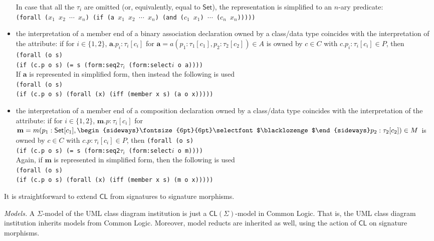 \documentclass[10pt,fleqn,final]{scrreprt}
\newcommand{\cbs}[0]{\color{red}\xspace} %
\newcommand{\cbe}[0]{\color{black}\xspace} %
\newcommand*{\CL}{\ensuremath{\mathsf{CL}}\xspace}
\newenvironment{definitions}[0]{\medskip }{}
\newcommand{\composition}{\raisebox{0.2pt}{\begin{sideways}\fontsize{6pt}{6pt}\selectfont$\blacklozenge$\end{sideways}}}
\newcommand{\white}[1]{{\color{white}{#1}}}
\newcommand{\qqquad}{\white{x}\qquad}
\begin{document}
\begin{definitions}
\begin{itemize}
In case that all the $\tau_i$ are omitted (or, equivalently, equal to 
$\mathsf{Set}$), the representation is simplified to an $n$-ary predicate:\\
\texttt{(forall ($x_1$ $x_2$ $\cdots$  $x_n$) (if (a $x_1$ $x_2$ $\cdots$  $x_n$) (and ($c_1$ $x_1$) $\cdots$ ($c_n$ $x_n$)))))}
\item the interpretation of a member end of a binary association
declaration owned by a class/data type coincides with the interpretation
of the attribute: if for $i\in\{1,2\}$, $\mathbf{a}.p_i : \tau_i[c_i]$ for
$\mathbf{a} = a(p_1 : \tau_1[c_1], p_2 : \tau_2[c_2]) \in A$ is owned by
$c \in C$ with $c.p_i : \tau_i[c_i] \in P$, then\\
\texttt{(forall (o s)\\
\qqquad (if (c.p o s) (= s (form:seq2$\tau_i$ (form:select$i$ o a))))}\\
If $\mathbf{a}$ is represented in simplified form, then instead\cbs the following is used\cbe \\
\texttt{(forall (o s)\\
\qqquad (if (c.p o s) (forall (x) (iff (member x s) (a o x)))))}
\item the interpretation of a member end of a composition declaration
owned by a class/data type coincides with the interpretation of the
attribute: if for $i\in\{1,2\}$, $\mathbf{m}.p : \tau_i[c_i]$ for $\mathbf{m}=m(p_1 : \mathsf{Set}[c_1], \composition p_2 : \tau_2[c_2]) \in M$ is owned
by $c \in C$ with $c.p : \tau_i[c_i] \in P$, then
\texttt{(forall (o s)\\
\qqquad (if (c.p o s) (= s (form:seq2$\tau_i$ (form:select$i$ o m))))}\\
Again, if $\mathbf{m}$ is represented in simplified form, then\cbs the following is used\cbe\\
\texttt{(forall (o s)\\
\qqquad (if (c.p o s) (forall (x) (iff (member x s) (m o x)))))}
\end{itemize}


It is straightforward to extend $\CL$ from signatures to signature morphisms.

\smallskip\noindent
\textit{Models.}
A $\Sigma$-model of the UML class diagram institution is just a
$\CL(\Sigma)$-model in Common Logic. That is, the UML class diagram
institution inherits models from Common Logic. Moreover, model reducts
are inherited as well, using the action of $\CL$ on signature morphisms.



\end{definitions}
\end{document}
